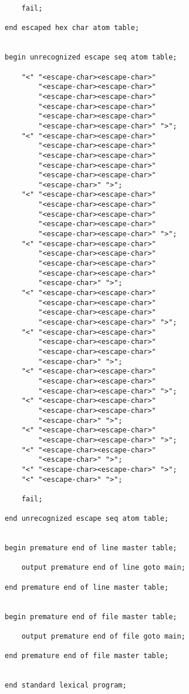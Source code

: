 \documentclass[12pt]{article}
\newenvironment{indpar}[1][0.3in]%
	{\begin{list}{}%
		     {\setlength{\itemsep}{0in}%
		      \setlength{\topsep}{0in}%
		      \setlength{\parsep}{1ex}%
		      \setlength{\labelwidth}{#1}%
		      \setlength{\leftmargin}{#1}%
		      \addtolength{\leftmargin}{\labelsep}}%
	 \item}%
	{\end{list}}
\begin{document}
\begin{indpar}
\begin{verbatim}
    fail;

end escaped hex char atom table;


begin unrecognized escape seq atom table;

    "<" "<escape-char><escape-char>"
        "<escape-char><escape-char>"
        "<escape-char><escape-char>"
        "<escape-char><escape-char>"
        "<escape-char><escape-char>"
        "<escape-char><escape-char>" ">";
    "<" "<escape-char><escape-char>"
        "<escape-char><escape-char>"
        "<escape-char><escape-char>"
        "<escape-char><escape-char>"
        "<escape-char><escape-char>"
        "<escape-char>" ">";
    "<" "<escape-char><escape-char>"
        "<escape-char><escape-char>"
        "<escape-char><escape-char>"
        "<escape-char><escape-char>"
        "<escape-char><escape-char>" ">";
    "<" "<escape-char><escape-char>"
        "<escape-char><escape-char>"
        "<escape-char><escape-char>"
        "<escape-char><escape-char>"
        "<escape-char>" ">";
    "<" "<escape-char><escape-char>"
        "<escape-char><escape-char>"
        "<escape-char><escape-char>"
        "<escape-char><escape-char>" ">";
    "<" "<escape-char><escape-char>"
        "<escape-char><escape-char>"
        "<escape-char><escape-char>"
        "<escape-char>" ">";
    "<" "<escape-char><escape-char>"
        "<escape-char><escape-char>"
        "<escape-char><escape-char>" ">";
    "<" "<escape-char><escape-char>"
        "<escape-char><escape-char>"
        "<escape-char>" ">";
    "<" "<escape-char><escape-char>"
        "<escape-char><escape-char>" ">";
    "<" "<escape-char><escape-char>"
        "<escape-char>" ">";
    "<" "<escape-char><escape-char>" ">";
    "<" "<escape-char>" ">";

    fail;

end unrecognized escape seq atom table;


begin premature end of line master table;

    output premature end of line goto main;

end premature end of line master table;


begin premature end of file master table;

    output premature end of file goto main;

end premature end of file master table;


end standard lexical program;
\end{verbatim}
\end{indpar}

\newpage
\end{document}
